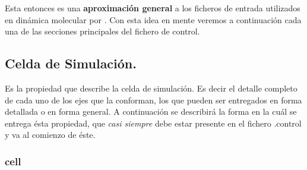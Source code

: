 
Esta entonces es una \textbf{aproximaci\'on general} a los ficheros de entrada utilizados en din\'amica molecular por {\lpmd}. Con esta idea en mente veremos a continuaci\'on cada una de las secciones principales del fichero de control.

\subsection{Celda de Simulaci\'on.}

Es la propiedad que describe la celda de simulaci\'on. Es decir el detalle completo de cada uno de los ejes que la conforman, los que pueden ser entregados en forma detallada o en forma general. A continuaci\'on se describir\'a la forma en la cu\'al se entrega \'esta propiedad, que \textit{casi siempre} debe estar presente en el fichero .control y va al comienzo de \'este.

\subsubsection{cell}

